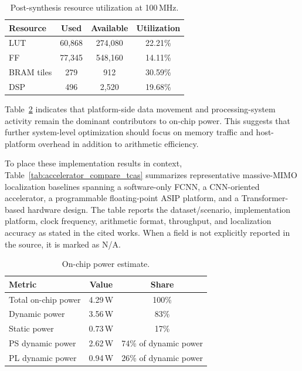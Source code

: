 \documentclass[lettersize,journal]{IEEEtran}
\begin{document}
\begin{table}[!t]
\caption{Post-synthesis resource utilization at 100\,MHz.}
\label{tab:resource_utilization_tcas}
\begin{center}
\footnotesize
\setlength{\tabcolsep}{6pt}
\renewcommand{\arraystretch}{1.08}
\begin{tabular}{|l|c|c|c|}
\hline
\textbf{Resource} & \textbf{Used} & \textbf{Available} & \textbf{Utilization} \\
\hline
LUT & 60,868 & 274,080 & 22.21\% \\
\hline
FF & 77,345 & 548,160 & 14.11\% \\
\hline
BRAM tiles & 279 & 912 & 30.59\% \\
\hline
DSP & 496 & 2,520 & 19.68\% \\
\hline
\end{tabular}
\end{center}
\end{table}

Table~\ref{tab:power_summary_tcas} indicates that platform-side data movement
and processing-system activity remain the dominant contributors to on-chip
power. This suggests that further system-level optimization should focus on
memory traffic and host-platform overhead in addition to arithmetic efficiency.

To place these implementation results in context, Table~\ref{tab:accelerator_compare_tcas}
summarizes representative massive-MIMO localization baselines spanning a
software-only FCNN, a CNN-oriented accelerator, a programmable floating-point
ASIP platform, and a Transformer-based hardware design. The table reports the
dataset/scenario, implementation platform, clock frequency, arithmetic format,
throughput, and localization accuracy as stated in the cited works. When a
field is not explicitly reported in the source, it is marked as N/A.

\begin{table}[!t]
\caption{On-chip power estimate.}
\label{tab:power_summary_tcas}
\begin{center}
\footnotesize
\setlength{\tabcolsep}{6pt}
\renewcommand{\arraystretch}{1.08}
\begin{tabular}{|l|c|c|}
\hline
\textbf{Metric} & \textbf{Value} & \textbf{Share} \\
\hline
Total on-chip power & 4.29\,W & 100\% \\
\hline
Dynamic power & 3.56\,W & 83\% \\
\hline
Static power & 0.73\,W & 17\% \\
\hline
PS dynamic power & 2.62\,W & 74\% of dynamic power \\
\hline
PL dynamic power & 0.94\,W & 26\% of dynamic power \\
\hline
\end{tabular}
\end{center}
\end{table}
\end{document}
